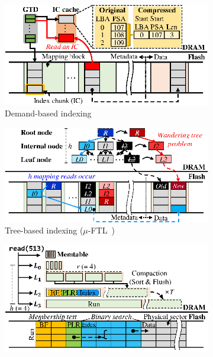 \begin{figure}[t]
     \centering
     \begin{subfigure}[b]{0.32\textwidth}
         \centering
         \includegraphics[width=\textwidth]{figs/OSDI/koo/dftl.eps}
         \caption{Demand-based indexing}
         \label{fig:demand}
     \end{subfigure}
     \hfill
     \begin{subfigure}[b]{0.32\textwidth}
         \centering
         \includegraphics[width=\textwidth]{figs/OSDI/koo/uftl.eps}
         \caption{Tree-based indexing ($\mu$-FTL~\cite{uftl})}
         \label{fig:mutree}
     \end{subfigure}
     \hfill
     \begin{subfigure}[b]{0.32\textwidth}
         \centering
         \includegraphics[width=\textwidth]{figs/OSDI/koo/lsm-short.eps}

\end{subfigure}
\end{figure}
